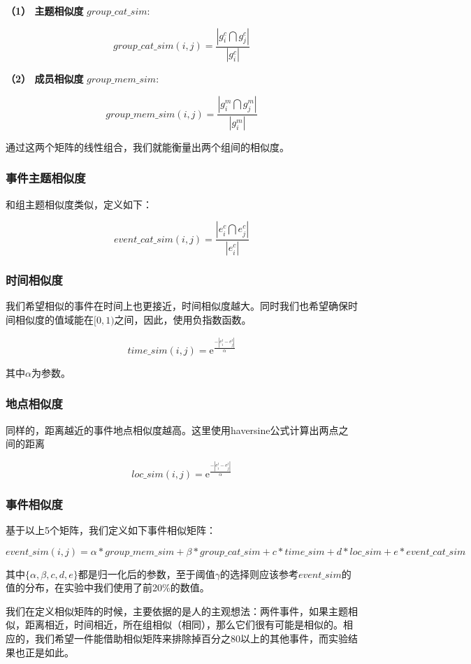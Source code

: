 \textbf{（1） 主题相似度} \(group\_cat\_sim:\)

\[
group\_cat\_sim(i,j)=\frac{|g_i^c\bigcap g_j^c|}{|g_i^c|}
\]

\textbf{（2） 成员相似度} \(group\_mem\_sim:\)

\[
group\_mem\_sim(i,j)=\frac{|g_i^m\bigcap g_j^m|}{|g_i^m|}
\]

通过这两个矩阵的线性组合，我们就能衡量出两个组间的相似度。

\subsubsection{事件主题相似度}

和组主题相似度类似，定义如下：

\[
event\_cat\_sim(i,j)=\frac{|e_i^c\bigcap e_j^c|}{|e_i^c|}
\]

\subsubsection{时间相似度}

我们希望相似的事件在时间上也更接近，时间相似度越大。同时我们也希望确保时间相似度的值域能在\([0,1)\)之间，因此，使用负指数函数。

\[    
time\_sim(i,j)=\mathrm{e}^\frac{-|e_i^t-e_j^t|}{\alpha}
\]

其中\(\alpha\)为参数。

\subsubsection{地点相似度}

同样的，距离越近的事件地点相似度越高。这里使用haversine公式计算出两点之间的距离

\[    
loc\_sim(i,j)=\mathrm{e}^\frac{-|e_i^l-e_j^l|}{\alpha}
\]

\subsubsection{事件相似度}
基于以上5个矩阵，我们定义如下事件相似矩阵：

\[    
event\_sim(i,j)=\alpha*group\_mem\_sim+\beta*group\_cat\_sim
+{c}*time\_sim+{d}*loc\_sim+{e}*event\_cat\_sim
\]

其中\(\{\alpha,\beta,{c},{d},{e}\}\)都是归一化后的参数，至于阈值\(\gamma\)的选择则应该参考\(event\_sim\)的值的分布，在实验中我们使用了前20\%的数值。

我们在定义相似矩阵的时候，主要依据的是人的主观想法：两件事件，如果主题相似，距离相近，时间相近，所在组相似（相同），那么它们很有可能是相似的。相应的，我们希望一件能借助相似矩阵来排除掉百分之80以上的其他事件，而实验结果也正是如此。

